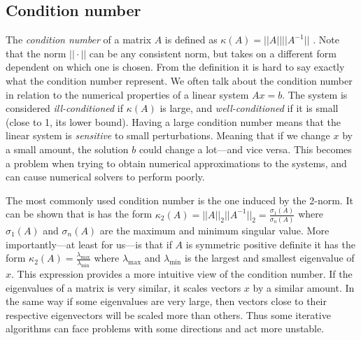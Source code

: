 \documentclass{article}
\theoremstyle{plain}
\theoremstyle{definition}
\theoremstyle{remark}
\begin{document}
\subsection{Condition number}
The \textit{condition number} of a matrix $A$ is defined as $\kappa (A) = ||A|| ||A^{-1}||$ \cite{quarteroni}.
Note that the norm $|| \cdot ||$ can be any consistent norm, but takes on a different form dependent on which one is chosen.
From the definition it is hard to say exactly what the condition number represent.
We often talk about the condition number in relation to the numerical properties of a linear system $Ax = b$.
The system is considered \textit{ill-conditioned} if $\kappa (A)$ is large, and \textit{well-conditioned} if it is small (close to 1, its lower bound).
Having a large condition number means that the linear system is \textit{sensitive} to small perturbations.
Meaning that if we change $x$ by a small amount, the solution $b$ could change a lot—and vice versa.
This becomes a problem when trying to obtain numerical approximations to the systems, and can cause numerical solvers to perform poorly.

The most commonly used condition number is the one induced by the 2-norm.
It can be shown that is has the form $\kappa_2 (A) = ||A||_2 ||A^{-1}||_2 = \frac{\sigma_1(A)}{\sigma_n(A)}$ where $\sigma_1 (A)$ and $\sigma_n(A)$ are the maximum and minimum singular value.
More importantly—at least for us—is that if $A$ is symmetric positive definite it has the form $\kappa_2(A) = \frac{\lambda_\text{max}}{\lambda_\text{min}}$ where $\lambda_{\text{max}}$ and $\lambda_{\text{min}}$ is the largest and smallest eigenvalue of $x$.
This expression provides a more intuitive view of the condition number.
If the eigenvalues of a matrix is very similar, it scales vectors $x$ by a similar amount.
In the same way if some eigenvalues are very large, then vectors close to their respective eigenvectors will be scaled more than others.
Thus some iterative algorithms can face problems with some directions and act more unstable.
\end{document}
